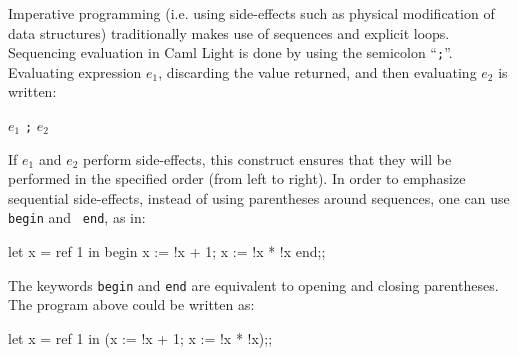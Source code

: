 Imperative programming (i.e. using side-effects such as physical
modification of data structures) traditionally makes use of sequences
and explicit loops. Sequencing evaluation in Caml Light is done by
using the semicolon ``\verb";"''. Evaluating expression $e_1$,
discarding the value returned, and then evaluating $e_2$ is written:
\begin{center}
$e_1$ {\tt ;} $e_2$
\end{center}
If $e_1$ and $e_2$ perform side-effects, this construct ensures
that they will be performed in the specified order (from left to
right). In order to emphasize sequential side-effects, instead of
using parentheses around sequences, one can use {\tt begin} and {\tt
end}, as in:
\begin{caml_example}
let x = ref 1 in
  begin
     x := !x + 1;
     x := !x * !x
  end;;
\end{caml_example}
The keywords {\tt begin} and {\tt end} are equivalent to opening and
closing parentheses. The program above could be written as:
\begin{caml_example}
let x = ref 1 in
  (x := !x + 1; x := !x * !x);;
\end{caml_example}

